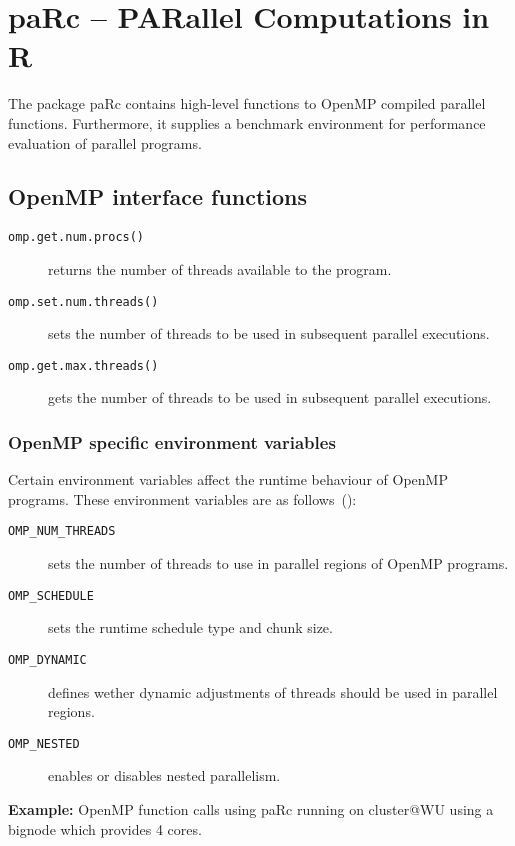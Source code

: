 \section{paRc -- PARallel Computations in R}
\label{sec:paRc}

The package paRc contains high-level functions to OpenMP compiled
parallel functions.
Furthermore, it supplies a benchmark environment for performance
evaluation of parallel programs.


\subsection{OpenMP interface functions}

\begin{description}
\item[\texttt{omp.get.num.procs()}] returns the number of threads
  available to the program.
\item[\texttt{omp.set.num.threads()}] sets the number of threads to be
  used in subsequent parallel executions.
\item[\texttt{omp.get.max.threads()}] gets the number of threads to be
  used in subsequent parallel executions.
\end{description}


\subsubsection{OpenMP specific environment variables}

Certain environment variables affect the runtime behaviour of OpenMP
programs. These environment variables are as
follows~(\cite{openMP05}):

\begin{description}
\item[\texttt{OMP_NUM_THREADS}] sets the number of threads to use in
  parallel regions of OpenMP programs. 
\item[\texttt{OMP_SCHEDULE}] sets the runtime schedule type and
  chunk size.
\item[\texttt{OMP_DYNAMIC}] defines wether dynamic adjustments of threads
  should be used in parallel regions.
\item[\texttt{OMP_NESTED}] enables or disables nested parallelism.
\end{description}



\textbf{Example:} OpenMP function calls using paRc \newline
running on cluster@WU using a bignode which provides 4 cores.

